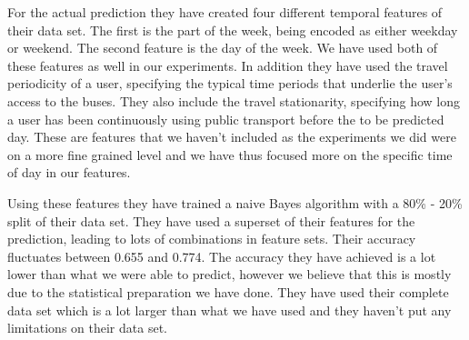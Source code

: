 For the actual prediction they have created four different temporal features of their data set. The first is the part of the week, being encoded as either weekday or weekend. The second feature is the day of the week. We have used both of these features as well in our experiments. In addition they have used the travel periodicity of a user, specifying the typical time periods that underlie the user's access to the buses. They also include the travel stationarity, specifying how long a user has been continuously using public transport before the to be predicted day. These are features that we haven't included as the experiments we did were on a more fine grained level and we have thus focused more on the specific time of day in our features.

Using these features they have trained a naive Bayes algorithm with a 80\% - 20\% split of their data set. They have used a superset of their features for the prediction, leading to lots of combinations in feature sets. Their accuracy fluctuates between 0.655 and 0.774. The accuracy they have achieved is a lot lower than what we were able to predict, however we believe that this is mostly due to the statistical preparation we have done. They have used their complete data set which is a lot larger than what we have used and they haven't put any limitations on their data set.